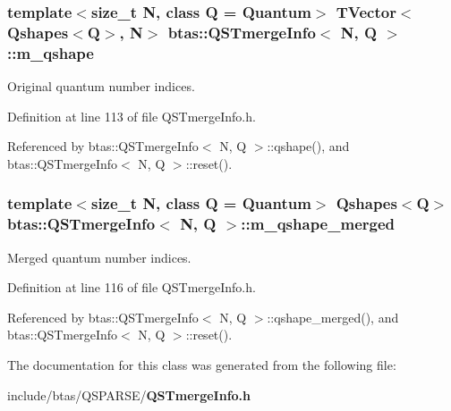 \subsubsection[{m\-\_\-qshape}]{\setlength{\rightskip}{0pt plus 5cm}template$<$size\-\_\-t N, class Q = Quantum$>$ {\bf T\-Vector}$<${\bf Qshapes}$<$Q$>$, N$>$ {\bf btas\-::\-Q\-S\-Tmerge\-Info}$<$ N, Q $>$\-::m\-\_\-qshape\hspace{0.3cm}{\ttfamily [private]}}\label{d0/de7/classbtas_1_1QSTmergeInfo_aeeb3f386d11a5b08cc1ffdd96a7fdb16}


Original quantum number indices. 



Definition at line 113 of file Q\-S\-Tmerge\-Info.\-h.



Referenced by btas\-::\-Q\-S\-Tmerge\-Info$<$ N, Q $>$\-::qshape(), and btas\-::\-Q\-S\-Tmerge\-Info$<$ N, Q $>$\-::reset().

\subsubsection[{m\-\_\-qshape\-\_\-merged}]{\setlength{\rightskip}{0pt plus 5cm}template$<$size\-\_\-t N, class Q = Quantum$>$ {\bf Qshapes}$<$Q$>$ {\bf btas\-::\-Q\-S\-Tmerge\-Info}$<$ N, Q $>$\-::m\-\_\-qshape\-\_\-merged\hspace{0.3cm}{\ttfamily [private]}}\label{d0/de7/classbtas_1_1QSTmergeInfo_a42d630f835b38c6893d06ca83741be04}


Merged quantum number indices. 



Definition at line 116 of file Q\-S\-Tmerge\-Info.\-h.



Referenced by btas\-::\-Q\-S\-Tmerge\-Info$<$ N, Q $>$\-::qshape\-\_\-merged(), and btas\-::\-Q\-S\-Tmerge\-Info$<$ N, Q $>$\-::reset().



The documentation for this class was generated from the following file\-:\begin{DoxyCompactItemize}
\item 
include/btas/\-Q\-S\-P\-A\-R\-S\-E/{\bf Q\-S\-Tmerge\-Info.\-h}\end{DoxyCompactItemize}
